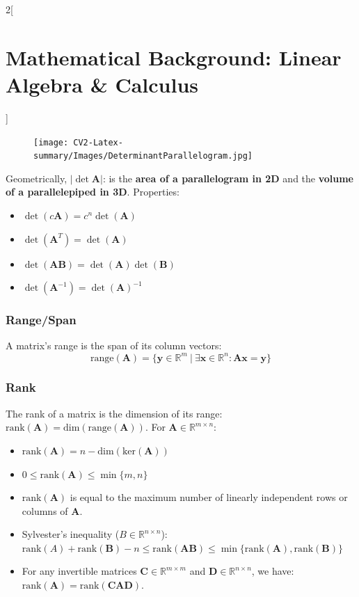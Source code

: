 \documentclass[oneside,fontsize=11pt,paper=a4]{scrartcl}
\begin{document}
\begin{multicols}{2}[\section{Mathematical Background: Linear Algebra \& Calculus}]
\setlength{\columnsep}{0cm}
\begin{figure}
    \texttt{[image: CV2-Latex-summary/Images/DeterminantParallelogram.jpg]}
\end{figure}
Geometrically, $\vert\det\mathbf{A}\vert$:
is the \textbf{area of a parallelogram in 2D} and the \textbf{volume of a parallelepiped in 3D}. Properties:
\begin{itemize}
    \setlength\itemsep{-0.2em}
    \item $\det(c\mathbf{A})=c^n\det(\mathbf{A})$ 
    \item $\det{(\mathbf{A}^T)}=\det(\mathbf{A})$
    \item $\det{(\mathbf{AB})}=\det(\mathbf{A})\det(\mathbf{B})$
    \item $\det{(\mathbf{A}^{-1})}=\det(\mathbf{A})^{-1}$
\end{itemize}

\subsubsection{Range/Span}
A matrix's range is the span of its column vectors:
\begin{equation*}
\text{range}(\mathbf{A}) = \{ \mathbf{y} \in \mathbb{R}^m \ \vert \ \exists \mathbf{x} \in \mathbb{R}^n: \mathbf{A}\mathbf{x}=\mathbf{y} \}
\end{equation*}

\subsubsection{Rank}
The rank of a matrix is the dimension of its range: $\text{rank}(\mathbf{A}) = \text{dim}(\text{range}(\mathbf{A}))$. For $\mathbf{A} \in \mathbb{R}^{m \times n}$:
\begin{itemize}
    \setlength\itemsep{-0.1em}
    \item $\text{rank}(\mathbf{A}) = n - \text{dim}(\text{ker}(\mathbf{A}))$
    \item $0 \leq \text{rank}(\mathbf{A}) \leq \min\{m, n\}$
    \item $\text{rank}(\mathbf{A})$ is equal to the maximum number of linearly independent rows or columns of $\mathbf{A}$.
    \item Sylvester's inequality ($B \in \mathbb{R}^{n \times n}$): {\small$\text{rank}(A) + \text{rank}(\mathbf{B}) - n \leq \text{rank}(\mathbf{AB}) \leq \min\{\text{rank}(\mathbf{A}), \text{rank}(\mathbf{B})\}$}
    \item For any invertible matrices $\mathbf{C} \in \mathbb{R}^{m \times m}$ and $\mathbf{D} \in \mathbb{R}^{n \times n}$, we have: $\text{rank}(\mathbf{A}) = \text{rank}(\mathbf{CAD})$.
\end{itemize}


\end{multicols}
\end{document}

